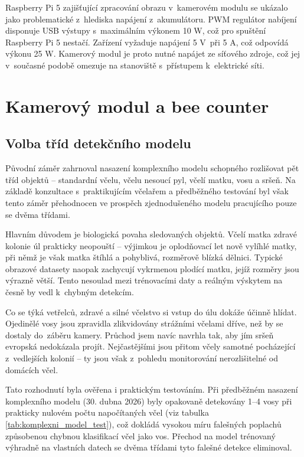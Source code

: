 Raspberry Pi 5 zajišťující zpracování obrazu v~kamerovém modulu se ukázalo jako problematické z~hlediska napájení z~akumulátoru. PWM regulátor nabíjení disponuje USB výstupy s~maximálním výkonem 10 W, což pro spuštění Raspberry Pi 5 nestačí. Zařízení vyžaduje napájení 5 V~při 5 A, což odpovídá výkonu 25 W. Kamerový modul je proto nutné napájet ze síťového zdroje, což jej v~současné podobě omezuje na stanoviště s~přístupem k~elektrické síti. 

\section{Kamerový modul a bee counter}
\subsection*{Volba tříd detekčního modelu}
Původní záměr zahrnoval nasazení komplexního modelu schopného rozlišovat pět tříd objektů -- standardní včelu, včelu nesoucí pyl, včelí matku, vosu a sršeň. Na základě konzultace s~praktikujícím včelařem a předběžného testování byl však tento záměr přehodnocen ve prospěch zjednodušeného modelu pracujícího pouze se dvěma třídami.

Hlavním důvodem je biologická povaha sledovaných objektů. Včelí matka zdravé kolonie úl prakticky neopouští -- výjimkou je oplodňovací let nově vylíhlé matky, při němž je však matka štíhlá a pohyblivá, rozměrově blízká dělnici. Typické obrazové datasety naopak zachycují vykrmenou plodící matku, jejíž rozměry jsou výrazně větší. Tento nesoulad mezi trénovacími daty a reálným výskytem na česně by vedl k~chybným detekcím.

Co se týká vetřelců, zdravé a silné včelstvo si vstup do úlu dokáže účinně hlídat. Ojedinělé vosy jsou zpravidla zlikvidovány strážními včelami dříve, než by se dostaly do~záběru kamery. Průchod jsem navíc navrhla tak, aby jím sršeň evropská nedokázala projít. Nejčastějšími  jsou přitom včely samotné pocházející z~vedlejších kolonií -- ty jsou však z~pohledu monitorování nerozlišitelné od domácích včel.

Tato rozhodnutí byla ověřena i praktickým testováním. Při předběžném nasazení komplexního modelu (30. dubna 2026) byly opakovaně detekovány 1--4 vosy při prakticky nulovém počtu napočítaných včel (viz tabulka \ref{tab:komplexni_model_test}), což dokládá vysokou míru falešných poplachů způsobenou chybnou klasifikací včel jako vos. Přechod na model trénovaný výhradně na vlastních datech se dvěma třídami tyto falešné detekce eliminoval.

